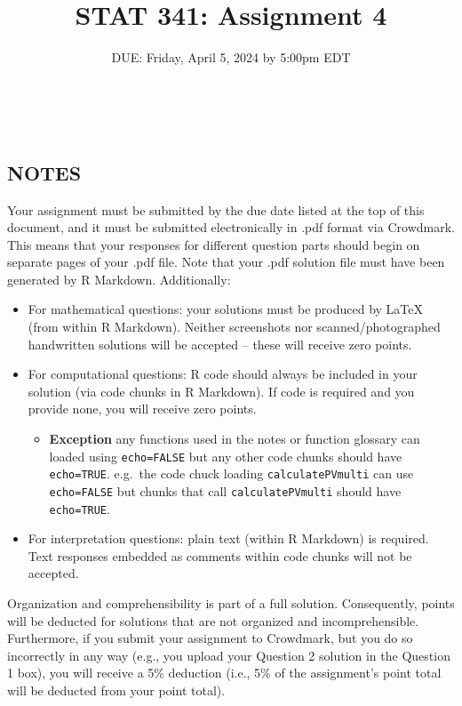 \documentclass[
]{article}
\title{STAT 341: Assignment 4}
\subtitle{DUE: Friday, April 5, 2024 by 5:00pm EDT}
\author{}
\date{\vspace{-2.5em}}
\providecommand{\tightlist}{%
  \setlength{\itemsep}{0pt}\setlength{\parskip}{0pt}}
\begin{document}
\maketitle

\(\;\) \(\;\) \(\;\) \(\;\)

\hypertarget{notes}{%
\subsection{NOTES}\label{notes}}

Your assignment must be submitted by the due date listed at the top of
this document, and it must be submitted electronically in .pdf format
via Crowdmark. This means that your responses for different question
parts should begin on separate pages of your .pdf file. Note that your
.pdf solution file must have been generated by R Markdown. Additionally:

\begin{itemize}
\item
  For mathematical questions: your solutions must be produced by LaTeX
  (from within R Markdown). Neither screenshots nor scanned/photographed
  handwritten solutions will be accepted -- these will receive zero
  points.
\item
  For computational questions: R code should always be included in your
  solution (via code chunks in R Markdown). If code is required and you
  provide none, you will receive zero points.

  \begin{itemize}
  \tightlist
  \item
    \textbf{Exception} any functions used in the notes or function
    glossary can loaded using \texttt{echo=FALSE} but any other code
    chunks should have \texttt{echo=TRUE}. e.g.~the code chuck loading
    \texttt{calculatePVmulti} can use \texttt{echo=FALSE} but chunks
    that call \texttt{calculatePVmulti} should have \texttt{echo=TRUE}.
  \end{itemize}
\item
  For interpretation questions: plain text (within R Markdown) is
  required. Text responses embedded as comments within code chunks will
  not be accepted.
\end{itemize}

Organization and comprehensibility is part of a full solution.
Consequently, points will be deducted for solutions that are not
organized and incomprehensible. Furthermore, if you submit your
assignment to Crowdmark, but you do so incorrectly in any way (e.g., you
upload your Question 2 solution in the Question 1 box), you will receive
a 5\% deduction (i.e., 5\% of the assignment's point total will be
deducted from your point total).
\end{document}

